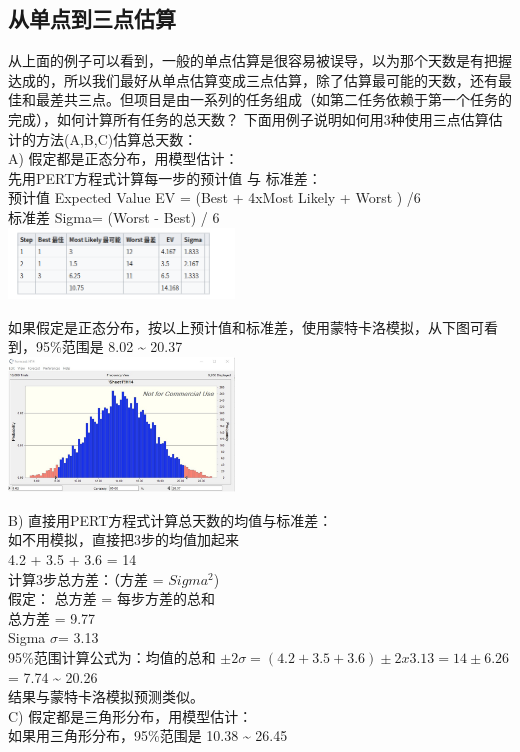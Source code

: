 \hypertarget{ux4eceux5355ux70b9ux52303ux70b9ux4f30ux7b97}{%
\subsection{从单点到三点估算}\label{ux4eceux5355ux70b9ux52303ux70b9ux4f30ux7b97}}

从上面的例子可以看到，一般的单点估算是很容易被误导，以为那个天数是有把握达成的，所以我们最好从单点估算变成三点估算，除了估算最可能的天数，还有最佳和最差共三点。但项目是由一系列的任务组成（如第二任务依赖于第一个任务的完成），如何计算所有任务的总天数？
下面用例子说明如何用3种使用三点估算估计的方法(A,B,C)估算总天数：\\
A) 假定都是正态分布，用模型估计：\\
先用PERT方程式计算每一步的预计值 与 标准差：\\
预计值 Expected Value EV = (Best + 4xMost Likely + Worst ) /6\\
标准差 Sigma= (Worst - Best) / 6\\

\includegraphics[width=6cm]{Screenshotfrom20221215004629.png}

如果假定是正态分布，按以上预计值和标准差，使用蒙特卡洛模拟，从下图可看到，95\%范围是
8.02 \textasciitilde{} 20.37\\

\includegraphics[width=6cm]{pert31.png}

B) 直接用PERT方程式计算总天数的均值与标准差：\\
如不用模拟，直接把3步的均值加起来\\
4.2 + 3.5 + 3.6 = 14\\
计算3步总方差：（方差 = \(Sigma^2\))\\
假定： 总方差 = 每步方差的总和\\
总方差 = 9.77\\
Sigma \(\sigma\)= 3.13\\
95\%范围计算公式为：均值的总和
\(\pm 2 \sigma = (4.2 + 3.5 + 3.6) \pm 2 x 3.13  = 14 \pm 6.26\)= 7.74
\textasciitilde{} 20.26\\
结果与蒙特卡洛模拟预测类似。\\
C) 假定都是三角形分布，用模型估计：\\
如果用三角形分布，95\%范围是 10.38 \textasciitilde{} 26.45\\

